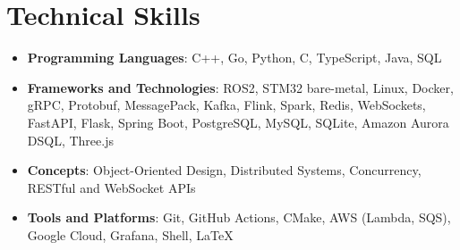 \documentclass[letterpaper,11pt]{article}
\newcommand{\resumeItem}[2]{
  \item\small{
    \vspace{2pt}\textbf{#1}{: #2 \vspace{-2pt}}
  }
}
\newcommand{\resumeSubItem}[2]{\resumeItem{#1}{#2}\vspace{-2pt}}
\newcommand{\resumeSubHeadingListStart}{\begin{itemize}[leftmargin=0in, labelsep=0in, label={}, itemsep=3pt]}
\newcommand{\resumeSubHeadingListEnd}{\end{itemize}}
\begin{document}
\section{Technical Skills}
\resumeSubHeadingListStart
\resumeSubItem{Programming Languages}
{C++, Go, Python, C, TypeScript, Java, SQL}
\resumeSubItem{Frameworks and Technologies}
{ROS2, STM32 bare-metal, Linux, Docker, gRPC, Protobuf, MessagePack, Kafka, Flink, Spark, Redis, WebSockets, FastAPI, Flask, Spring Boot, PostgreSQL, MySQL, SQLite, Amazon Aurora DSQL, Three.js}
\resumeSubItem{Concepts}
{Object-Oriented Design, Distributed Systems, Concurrency, RESTful and WebSocket APIs}
\resumeSubItem{Tools and Platforms}
{Git, GitHub Actions, CMake, AWS (Lambda, SQS), Google Cloud, Grafana, Shell, \LaTeX}
\resumeSubHeadingListEnd
\end{document}
